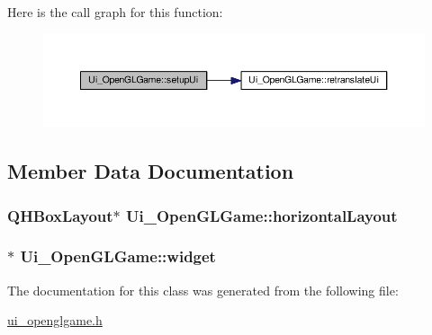 Here is the call graph for this function\-:\nopagebreak
\begin{figure}[H]
\begin{center}
\leavevmode
\includegraphics[width=350pt]{classUi__OpenGLGame_a0a1f93aa9935d6ccf076548c88c7148c_cgraph}
\end{center}
\end{figure}




\subsection{Member Data Documentation}
\hypertarget{classUi__OpenGLGame_a6914c010097fc4d54215a6b2ee09aeef}{
\subsubsection[{horizontal\-Layout}]{\setlength{\rightskip}{0pt plus 5cm}Q\-H\-Box\-Layout$\ast$ Ui\-\_\-\-Open\-G\-L\-Game\-::horizontal\-Layout}}\label{classUi__OpenGLGame_a6914c010097fc4d54215a6b2ee09aeef}
\hypertarget{classUi__OpenGLGame_a81f982e88df9a2561692f93337d1d102}{
\subsubsection[{widget}]{$\ast$ Ui\-\_\-\-Open\-G\-L\-Game\-::widget}}\label{classUi__OpenGLGame_a81f982e88df9a2561692f93337d1d102}


The documentation for this class was generated from the following file\-:\begin{DoxyCompactItemize}
\item 
\hyperlink{ui__openglgame_8h}{ui\-\_\-openglgame.\-h}\end{DoxyCompactItemize}
